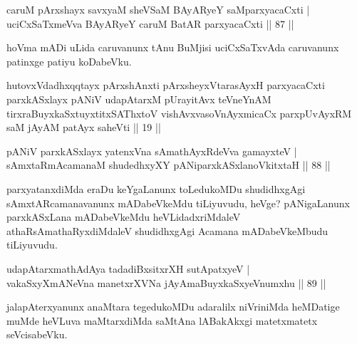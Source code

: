 
\begin{shl}
caruM pArxshayx savxyaM sheVSaM BAyARyeY saMparxyacaCxti | \\
uciCxSaTxmeVva BAyARyeY caruM BatAR parxyacaCxti \hfill|| 87 || 
\end{shl}

\begin{artha}
hoVma mADi uLida caruvanunx tAnu BuMjisi uciCxSaTxvAda caruvanunx 
patinxge patiyu koDabeVku.
\end{artha}


\begin{shl}
hutovxVdadhxqqtayx pArxshAnxti pArxsheyxVtarasAyxH parxyacaCxti parxkASxlayx pANiV udapAtarxM pUrayitAvx teVneYnAM tirxraBuyxkaSxtuyxtitxSAThxtoV vishAvxvasoV\s nAyxmicaCx parxpUvAyxRM saM jAyAM patAyx saheVti || 19 ||
\end{shl}

\begin{shl}
pANiV parxkASxlayx yatenxVna sAmathAyxRdeVva gamayxteV | \\
sAmxtaRmAcamanaM shudedhxyXY pANiparxkASxlanoVkitxtaH \hfill|| 88 || 
\end{shl}

\begin{artha}
parxyatanxdiMda eraDu keYgaLanunx toLedukoMDu shudidhxgAgi 
sAmxtARcamana\-vanunx mADabeVkeMdu tiLiyuvudu, heVge? pANigaLanunx 
parxkASxLana mADabeVkeMdu heVLidadxriMdaleV athaRsAmathaRyxdiMdaleV
shudidhxgAgi Acamana mADabeVkeMbudu tiLiyuvudu.
\end{artha}


\begin{shl}
udapAtarxmathA\s \s dAya tadadiBxsitxrXH sutApatxyeV | \\
vakaSxyXmANeVna manetxrXVNa jAyAmaBuyxkaSxyeVnumxhu \hfill|| 89 || 
\end{shl}

\begin{artha}
jalapAterxyanunx anaMtara tegedukoMDu adaralilx niVriniMda heMDatige muMde heVLuva maMtarxdiMda saMtAna lABakAkxgi matetxmatetx seVcisabeVku.
\end{artha}


